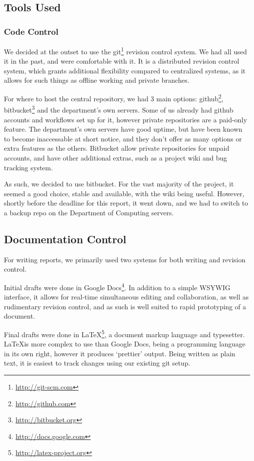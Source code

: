   \subsection{Tools Used}
    \subsubsection{Code Control}
      We decided at the outset to use the git\footnote{\url{http://git-scm.com}} revision control system.
      We had all used it in the past, and were comfortable with it.
      It is a distributed revision control system, which grants additional flexibility compared to centralized systems, as it allows for such things as offline working and private branches.

      For where to host the central repository, we had 3 main options: github\footnote{\url{http://github.com}}, bitbucket\footnote{\url{http://bitbucket.org}} and the department's own servers.
      Some of us already had github accounts and workflows set up for it, however private repositories are a paid-only feature.
      The department's own servers have good uptime, but have been known to become inaccessable at short notice, and they don't offer as many options or extra features as the others.
      Bitbucket allow private repositories for unpaid accounts, and have other additional extras, such as a project wiki and bug tracking system.

      As such, we decided to use bitbucket.
      For the vast majority of the project, it seemed a good choice, stable and available, with the wiki being useful.
      However, shortly before the deadline for this report, it went down, and we had to switch to a backup repo on the Department of Computing servers.

    \subsection{Documentation Control}
      For writing reports, we primarily used two systems for both writing and revision control.

      Initial drafts were done in Google Docs\footnote{\url{http://docs.google.com}}.
      In addition to a simple WSYWIG interface, it allows for real-time simultaneous editing and collaboration, as well as rudimentary revision control, and as such is well suited to rapid prototyping of a document.

      Final drafts were done in \LaTeX\footnote{\url{http://latex-project.org}}, a document markup language and typesetter.
      \LaTeX is more complex to use than Google Docs, being a programming language in its own right, however it produces `prettier' output.
      Being written as plain text, it is easiest to track changes using our existing git setup.

